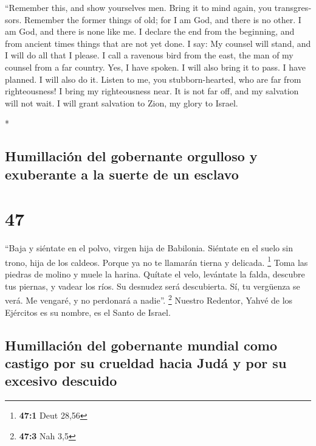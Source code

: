 \begin{paracol}{2}
\begin{otherlanguage}{english}
 ``Remember this, and show yourselves men. Bring it to
mind again, you transgressors.  Remember the former things
of old; for I am God, and there is no other. I am God, and there is none
like me.  I declare the end from the beginning, and from
ancient times things that are not yet done. I say: My counsel will
stand, and I will do all that I please.  I call a
ravenous bird from the east, the man of my counsel from a far country.
Yes, I have spoken. I will also bring it to pass. I have planned. I will
also do it.  Listen to me, you stubborn-hearted, who are
far from righteousness!  I bring my righteousness near.
It is not far off, and my salvation will not wait. I will grant
salvation to Zion, my glory to Israel.

\end{otherlanguage}

\switchcolumn[0]*

\hypertarget{humillaciuxf3n-del-gobernante-orgulloso-y-exuberante-a-la-suerte-de-un-esclavo}{%
\subsection{Humillación del gobernante orgulloso y exuberante a la
suerte de un
esclavo}\label{humillaciuxf3n-del-gobernante-orgulloso-y-exuberante-a-la-suerte-de-un-esclavo}}

\hypertarget{section-92}{%
\section{47}\label{section-92}}

 ``Baja y siéntate en el polvo, virgen hija de Babilonia.
Siéntate en el suelo sin trono, hija de los caldeos. Porque ya no te
llamarán tierna y delicada. \footnote{\textbf{47:1} Deut 28,56}
 Toma las piedras de molino y muele la harina. Quítate el
velo, levántate la falda, descubre tus piernas, y vadear los ríos.
 Su desnudez será descubierta. Sí, tu vergüenza se verá.
Me vengaré, y no perdonará a nadie''. \footnote{\textbf{47:3} Nah 3,5}
 Nuestro Redentor, Yahvé de los Ejércitos es su nombre, es
el Santo de Israel.

\hypertarget{humillaciuxf3n-del-gobernante-mundial-como-castigo-por-su-crueldad-hacia-juduxe1-y-por-su-excesivo-descuido}{%
\subsection{Humillación del gobernante mundial como castigo por su
crueldad hacia Judá y por su excesivo
descuido}\label{humillaciuxf3n-del-gobernante-mundial-como-castigo-por-su-crueldad-hacia-juduxe1-y-por-su-excesivo-descuido}}


\end{paracol}
